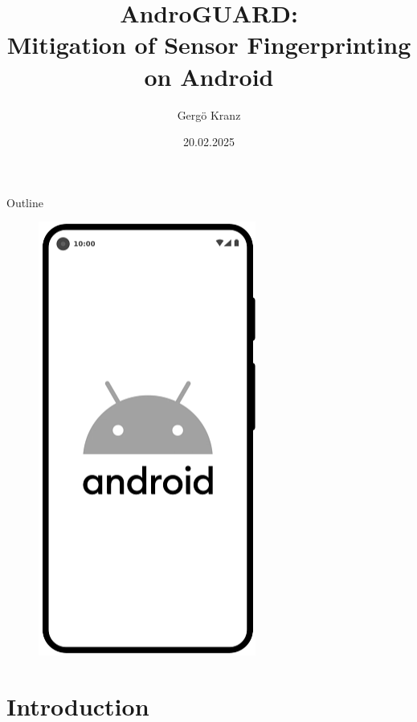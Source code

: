 \documentclass[aspectratio=169]{beamer}
[aspectratio=169] %
\title[AndroGUARD]{AndroGUARD:\\Mitigation of Sensor Fingerprinting\\on Android}
\author{Gergö Kranz}
\date{20.02.2025}
\institute{ISEC}
\begin{document}
\begin{frame}[plain]
  \maketitle
\end{frame}


\begin{frame}{Outline}
  \begin{minipage}{0.49\textwidth} 
    \tableofcontents
  \end{minipage}
  \hfill
  \begin{minipage}{0.49\textwidth} 
    \begin{figure}
      \centering
      \includegraphics[height=0.5\textheight]{figures/android_device.png}
    \end{figure}
  \end{minipage}
\end{frame}


\section{Introduction}
\end{document}
